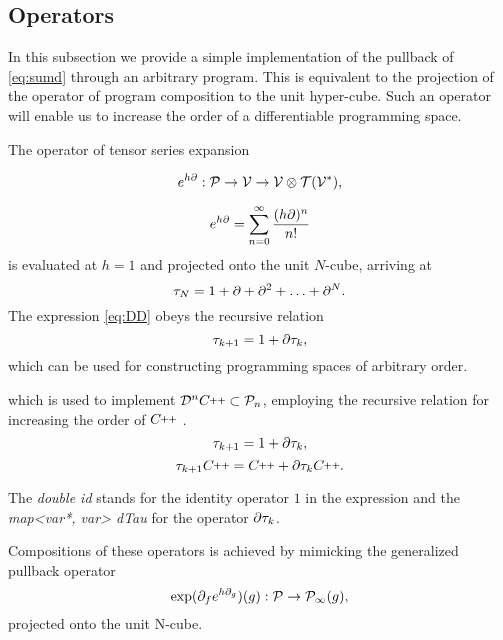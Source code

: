              
\subsection{Operators}\label{sec:operators}

In this subsection we provide a simple implementation of the pullback of \eqref{eq:sumd} through an arbitrary program. This is equivalent to the projection of the operator of program composition to the unit hyper-cube. Such an operator will enable us to increase the order of a differentiable programming space. 

The operator of tensor series expansion \cite[Theorem~5.1]{OperationalCalculus}

\begin{equation}\label{eq:specProg}
            e^{h\partial}:\mathcal{P}\to\mathcal{V}\to \mathcal{V}\otimes \mathcal{T}(\mathcal{V}^*),
          \end{equation}

\begin{equation}
  e^{h\partial}=\sum\limits_{n=0}^{\infty}\frac{(h\partial)^n}{n!}
 \end{equation}
 is evaluated at $h=1$ and projected onto the unit $N$-cube, arriving at 
\begin{equation}\label{eq:DD}
    \tau_N = 1+\partial +\partial^2 +\ldots + \partial^N.
  \end{equation}
The expression \eqref{eq:DD} obeys the recursive relation
\begin{equation}
      \label{eq:rekurzija}
      \tau_{k+1} = 1+\partial\tau_k,
    \end{equation}
which can be used for constructing programming spaces of arbitrary order.


which is used to implement $\DD^n\CC\subset\dP_n$, employing the recursive relation for increasing the order of $\CC$ \cite[Proposition~5.1]{OperationalCalculus}.
\begin{equation}
      \label{eq:rekurzija}
      \tau_{k+1} = 1+\partial\tau_k,
    \end{equation}
\begin{equation}
\sumd_{k+1}\CC = \CC+\D\sumd_k\CC.
\end{equation}
        
        The \emph{double id} stands for the identity operator $1$ in the expression and the \emph{map<var*, var> dTau} for the operator $\partial\tau_k$.
        
        Compositions of these operators is achieved by mimicking the generalized pullback operator \cite[Remark~11]{OperationalCalculus}
        \begin{equation}\label{eq:opKompo}
          \exp(\partial_fe^{h\partial_g})(g): \mathcal{P}\to\mathcal{P}_\infty(g),
          \end{equation}
          projected onto the unit N-cube.
          
